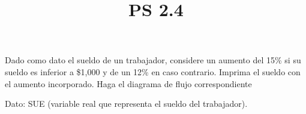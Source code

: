 \documentclass[11pt]{amsart}
\title{PS 2.4}
\begin{document}
\maketitle
\noindent Dado como dato el sueldo de un trabajador, considere un aumento del 15\% si su sueldo es inferior a \$1,000 y de un 12\% en caso contrario. Imprima el sueldo con el aumento incorporado. Haga el diagrama de flujo correspondiente


\noindent Dato: SUE (variable real que representa el sueldo del trabajador).
\end{document}
